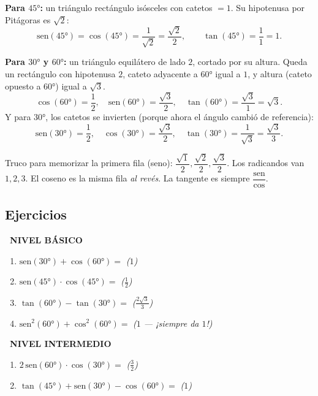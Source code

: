 \documentclass[11pt,a4paper]{article}
\newcommand{\nivelbasico}{%
  \par\smallskip\colorbox{green!60!black}{\color{white}\small\bfseries\ NIVEL BÁSICO\ }\par\smallskip}
\newcommand{\nivelintermedio}{%
  \par\smallskip\colorbox{naranja}{\color{white}\small\bfseries\ NIVEL INTERMEDIO\ }\par\smallskip}
\begin{document}
\textbf{Para $45°$:} un triángulo rectángulo isósceles con catetos $= 1$. Su hipotenusa por Pitágoras es $\sqrt{2}$:
\[
  \mathrm{sen}(45°) = \cos(45°) = \frac{1}{\sqrt{2}} = \frac{\sqrt{2}}{2}, \qquad \tan(45°) = \frac{1}{1} = 1.
\]

\textbf{Para $30°$ y $60°$:} un triángulo equilátero de lado $2$, cortado por su altura. Queda un rectángulo con hipotenusa $2$, cateto adyacente a $60°$ igual a $1$, y altura (cateto opuesto a $60°$) igual a $\sqrt{3}$.
\[
  \cos(60°) = \frac{1}{2}, \quad \mathrm{sen}(60°) = \frac{\sqrt{3}}{2}, \quad \tan(60°) = \frac{\sqrt{3}}{1} = \sqrt{3}.
\]
Y para $30°$, los catetos se invierten (porque ahora el ángulo cambió de referencia):
\[
  \mathrm{sen}(30°) = \frac{1}{2}, \quad \cos(30°) = \frac{\sqrt{3}}{2}, \quad \tan(30°) = \frac{1}{\sqrt{3}} = \frac{\sqrt{3}}{3}.
\]

\begin{tcolorbox}[tip]
Truco para memorizar la primera fila (seno): $\dfrac{\sqrt{1}}{2}, \dfrac{\sqrt{2}}{2}, \dfrac{\sqrt{3}}{2}$. Los radicandos van $1, 2, 3$. El coseno es la misma fila \emph{al revés}. La tangente es siempre $\dfrac{\mathrm{sen}}{\cos}$.
\end{tcolorbox}

\subsection*{Ejercicios}

\nivelbasico

\begin{enumerate}[label=\textbf{\arabic*.},leftmargin=1cm,itemsep=6pt]
  \item $\mathrm{sen}(30°) + \cos(60°) = $ \hfill \textit{($1$)}
  \item $\mathrm{sen}(45°) \cdot \cos(45°) = $ \hfill \textit{($\frac{1}{2}$)}
  \item $\tan(60°) - \tan(30°) = $ \hfill \textit{($\frac{2\sqrt{3}}{3}$)}
  \item $\mathrm{sen}^{2}(60°) + \cos^{2}(60°) = $ \hfill \textit{($1$ --- ¡siempre da $1$!)}
\end{enumerate}

\nivelintermedio

\begin{enumerate}[label=\textbf{\arabic*.},leftmargin=1cm,itemsep=6pt,start=5]
  \item $2\,\mathrm{sen}(60°) \cdot \cos(30°) = $ \hfill \textit{($\frac{3}{2}$)}
  \item $\tan(45°) + \mathrm{sen}(30°) - \cos(60°) = $ \hfill \textit{($1$)}
\end{enumerate}
\end{document}
